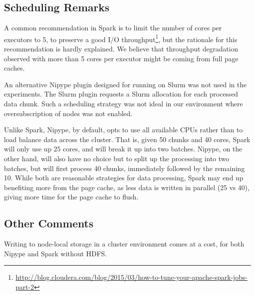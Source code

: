 \documentclass{IEEEtran}
\begin{document}
\subsection{Scheduling Remarks}

A common recommendation in Spark is to limit the number of cores per 
executors to 5, to preserve a good I/O 
throughput\footnote{\url{http://blog.cloudera.com/blog/2015/03/how-to-tune-your-apache-spark-jobs-part-2}}, but the rationale
for this recommendation is hardly explained. 
We believe that throughput degradation observed with more than 5 cores 
per executor might be coming from full page caches.

An alternative Nipype plugin designed for running on Slurm was not used in the experiments.
The Slurm plugin requests a Slurm allocation for each processed data chunk. Such a
scheduling strategy was not ideal in our environment where oversubscription of nodes was 
not enabled.

Unlike Spark, Nipype, by default, opts to use all available CPUs rather than to load balance
data across the cluster. That is, given 50 chunks and 40 cores, Spark will only use up 25
cores, and will break it up into two batches. Nipype, on the other hand, will also have no 
choice but to split up the processing into two batches, but will first process 40 chunks, 
immediately followed by the remaining 10. While both are reasonable strategies for 
data processing, Spark may end up benefiting more from the page cache, as less data is 
written in parallel (25 vs 40), giving more time for the page cache to flush.

\subsection{Other Comments}

Writing to node-local storage in a cluster environment comes at a cost, for both
Nipype and Spark without HDFS.

\end{document}
